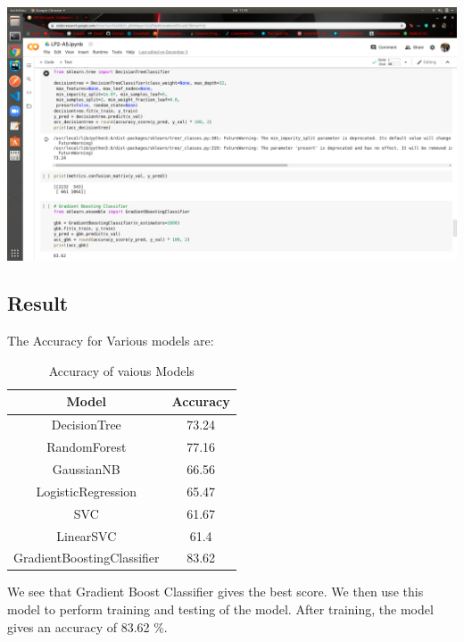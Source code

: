 \documentclass[a4paper, 12pt]{article}
\begin{document}
\begin{center}
    \includegraphics[width=\linewidth]{DT_GB.png}
\end{center}


\newpage
\begin{center}
\section{Result}
\end{center}
\par 
The Accuracy for Various models are:
\begin{table}[h]
    \centering
    \begin{tabular}{|c|c|}
    \hline
         Model & Accuracy \\
    \hline
         DecisionTree & 73.24\\
    \hline
    RandomForest & 77.16\\
    \hline
    GaussianNB & 66.56\\
    \hline
   
    LogisticRegression & 65.47\\
    \hline
    SVC & 61.67 \\
    \hline
    LinearSVC & 61.4 \\
    \hline
    GradientBoostingClassifier & 83.62 \\
    
    \hline
    \end{tabular}
    \caption{Accuracy of vaious Models}
\end{table}
\par  We see that Gradient Boost Classifier gives the best score. We then use this model to perform training and testing of the model. After training, the model gives an accuracy of 83.62  \%.
\end{document}
